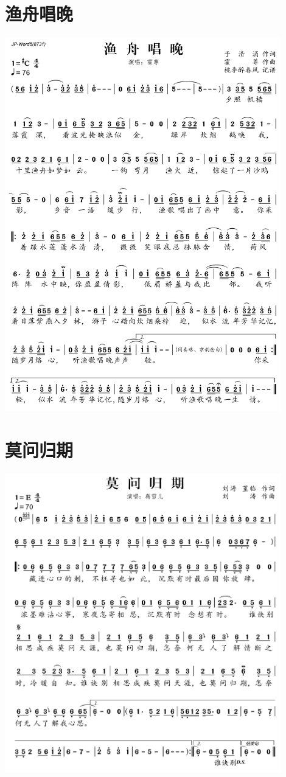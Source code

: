 \documentclass[cn,pad,twocol]{elegantbook}
\begin{document}
\section{渔舟唱晚} \includegraphics[width=0.9\textwidth]{macos/2020渔舟唱晚.png}
\section{莫问归期} \includegraphics[width=0.9\textwidth]{macos/2020莫问归期.png}
\end{document}
